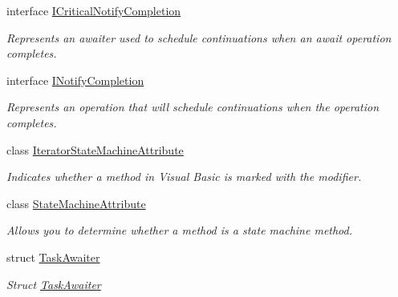 \begin{DoxyCompactItemize}
interface \hyperlink{interface_system_1_1_runtime_1_1_compiler_services_1_1_i_critical_notify_completion}{I\+Critical\+Notify\+Completion}
\begin{DoxyCompactList}\small\item\em Represents an awaiter used to schedule continuations when an await operation completes. \end{DoxyCompactList}\item 
interface \hyperlink{interface_system_1_1_runtime_1_1_compiler_services_1_1_i_notify_completion}{I\+Notify\+Completion}
\begin{DoxyCompactList}\small\item\em Represents an operation that will schedule continuations when the operation completes. \end{DoxyCompactList}\item 
class \hyperlink{class_system_1_1_runtime_1_1_compiler_services_1_1_iterator_state_machine_attribute}{Iterator\+State\+Machine\+Attribute}
\begin{DoxyCompactList}\small\item\em Indicates whether a method in Visual Basic is marked with the  modifier. \end{DoxyCompactList}\item 
class \hyperlink{class_system_1_1_runtime_1_1_compiler_services_1_1_state_machine_attribute}{State\+Machine\+Attribute}
\begin{DoxyCompactList}\small\item\em Allows you to determine whether a method is a state machine method. \end{DoxyCompactList}\item 
struct \hyperlink{struct_system_1_1_runtime_1_1_compiler_services_1_1_task_awaiter}{Task\+Awaiter}
\begin{DoxyCompactList}\small\item\em Struct \hyperlink{struct_system_1_1_runtime_1_1_compiler_services_1_1_task_awaiter}{Task\+Awaiter} \end{DoxyCompactList}\end{DoxyCompactItemize}
